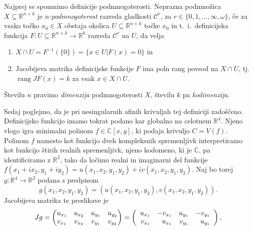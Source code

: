 \documentclass[mat1]{fmfdelo}
\newcommand{\tikzmark}[1]{\tikz[overlay,remember picture,baseline=(#1.base)]
  \node (#1) {\strut};}
\newcommand{\R}{\mathbb R}
\newcommand{\C}{\mathbb C}
\DeclareMathOperator{\rang}{rang}
\theoremstyle{definition}
\begin{document}
\begin{dokaz}
    Najprej se spomnimo definicije podmnogoterosti. Neprazna podmnožica $X \subseteq \R^{n+k}$ je \emph{$n$-podmnogoterost} razreda gladkosti $\mathcal{C}^r$, za $r \in \{0,1,\dots, \infty, \omega\}$, če za vsako točko $x_0 \in X$ obstaja okolica $U \subseteq \R^{n+k}$ točke $x_0$ in t.~i.\ definicijska funkcija $F: U \subseteq \R^{n+k} \to \R^k$ razreda $\mathcal{C}^r$ na $U$, da velja
    \begin{enumerate}
        \item $X \cap U = F^{-1}(\{0\}) = \{x \in U | F(x) = 0\}$ in
        \item Jacobijeva matrika definicijske funkcije $F$ ima poln rang povsod na $X \cap U$, tj. $\rang J F(x) = k$ za vsak $x \in X \cap U$.
    \end{enumerate}
    Številu $n$ pravimo \emph{dimenzija} podmnogoterosti $X$, številu $k$ pa \emph{kodimenzija}.
    \\
    \par
    Sedaj poglejmo, da je pri nesingularnih afinih krivuljah tej definiciji zadoščeno. Definicijsko funkcijo imamo tokrat podano kar globalno na celotnem $\R^4$. Njeno vlogo igra minimalni polinom $f \in \C[x,y]$, ki podaja krivuljo $C = V(f)$. Polinom $f$ namesto kot funkcijo dveh kompleksnih spremenljivk interpretiramo kot funkcijo štirih realnih spremenljivk, njeno kodomeno, ki je $\C$, pa identificiramo z $\R^2$, tako da ločimo realni in imaginarni del funkcije $f(x_1 + ix_2, y_1 + iy_2) = u(x_1,x_2,y_1,y_2) + iv(x_1,x_2,y_1,y_2)$. Naj bo torej $g: \R^4 \to \R^2$ podana s predpisom
    \[
        g(x_1,x_2,y_1,y_2) = (u(x_1,x_2,y_1,y_2), v(x_1,x_2,y_1,y_2)).
    \]
    Jacobijeva matrika te preslikave je
    \[
    Jg = 
    \begin{pmatrix}
        u_{x_1} & u_{x_2} & u_{y_1} & u_{y_2} \\
        v_{x_1} & v_{x_2} & v_{y_1} & v_{y_2}
    \end{pmatrix}
    =
    \left (
        \begin{array}{rrrr}
            u_{x_1} & -v_{x_1} & u_{y_1} & -v_{y_1} \\
            \tikzmark{lower1} v_{x_1} & u_{x_1}\tikzmark{lower2} & \tikzmark{lower3} v_{y_1} & u_{y_1} \tikzmark{lower4}\\
        \end{array}
    \right ),
    \]
        

\end{dokaz}
\end{document}

